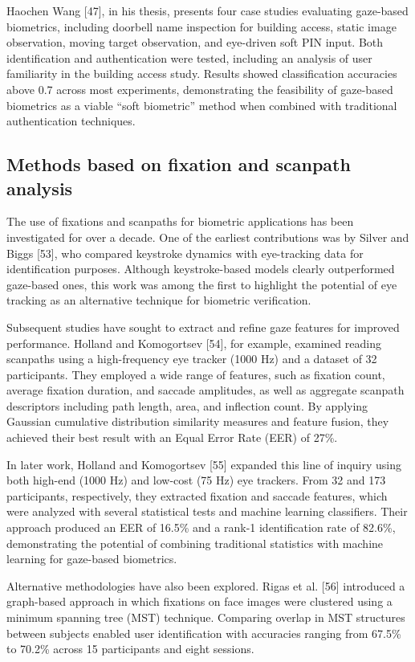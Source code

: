 \documentclass{article}
\begin{document}
Haochen Wang [47], in his thesis, presents four case studies evaluating gaze-based biometrics, including doorbell name inspection for building access, static image observation, moving target observation, and eye-driven soft PIN input.
Both identification and authentication were tested, including an analysis of user familiarity in the building access study. 
Results showed classification accuracies above 0.7 across most experiments, demonstrating the feasibility of gaze-based biometrics as a viable “soft biometric” method when combined with traditional authentication techniques.

\subsection{Methods based on fixation and scanpath analysis}

The use of fixations and scanpaths for biometric applications has been investigated for over a decade.
One of the earliest contributions was by Silver and Biggs [53], who compared keystroke dynamics with eye-tracking data for identification purposes. 
Although keystroke-based models clearly outperformed gaze-based ones, this work was among the first to highlight the potential of eye tracking as an alternative technique for biometric verification.

Subsequent studies have sought to extract and refine gaze features for improved performance. 
Holland and Komogortsev [54], for example, examined reading scanpaths using a high-frequency eye tracker (1000 Hz) and a dataset of 32 participants. 
They employed a wide range of features, such as fixation count, average fixation duration, and saccade amplitudes, as well as aggregate scanpath descriptors including path length, area, and inflection count.
By applying Gaussian cumulative distribution similarity measures and feature fusion, they achieved their best result with an Equal Error Rate (EER) of 27\%. 

In later work, Holland and Komogortsev [55] expanded this line of inquiry using both high-end (1000 Hz) and low-cost (75 Hz) eye trackers. 
From 32 and 173 participants, respectively, they extracted fixation and saccade features, which were analyzed with several statistical tests and machine learning classifiers. 
Their approach produced an EER of 16.5\% and a rank-1 identification rate of 82.6\%, demonstrating the potential of combining traditional statistics with machine learning for gaze-based biometrics.

Alternative methodologies have also been explored. 
Rigas et al. [56] introduced a graph-based approach in which fixations on face images were clustered using a minimum spanning tree (MST) technique.
Comparing overlap in MST structures between subjects enabled user identification with accuracies ranging from 67.5\% to 70.2\% across 15 participants and eight sessions.
\end{document}
